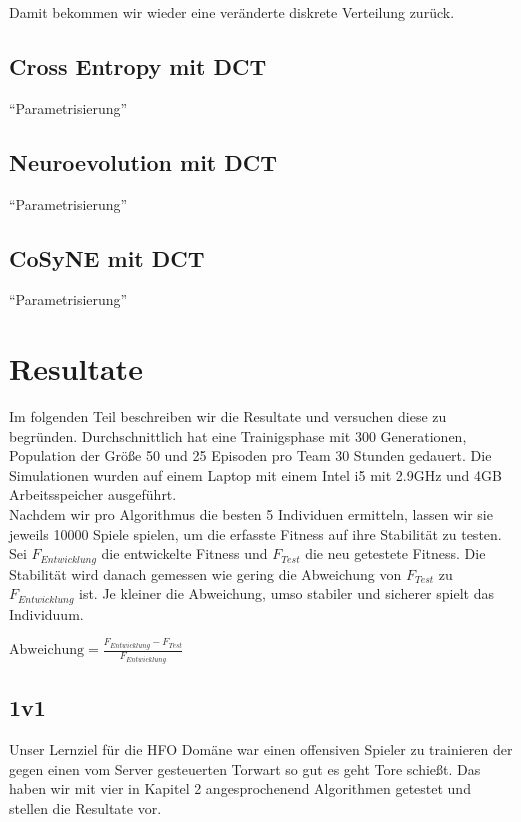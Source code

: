             Damit bekommen wir wieder eine veränderte diskrete Verteilung zurück.
        \subsection{Cross Entropy mit DCT}
            ``Parametrisierung''
        \subsection{Neuroevolution mit DCT}
            ``Parametrisierung''
        \subsection{CoSyNE mit DCT}
            ``Parametrisierung''

    \section{Resultate}
        Im folgenden Teil beschreiben wir die Resultate und versuchen diese zu begründen. Durchschnittlich hat eine Trainigsphase mit 300 Generationen, Population der Größe 50 und 25 Episoden pro Team 30 Stunden gedauert. Die Simulationen wurden auf einem Laptop mit einem Intel i5 mit 2.9GHz und 4GB Arbeitsspeicher ausgeführt.\\[2mm]
        \noindent
        Nachdem wir pro Algorithmus die besten 5 Individuen ermitteln, lassen wir sie jeweils 10000 Spiele spielen, um die erfasste Fitness auf ihre Stabilität zu testen. \\[2mm]
        \noindent
        Sei $F_{Entwicklung}$ die entwickelte Fitness und $F_{Test}$ die neu getestete Fitness. Die Stabilität wird danach gemessen wie gering die Abweichung von $F_{Test}$ zu $F_{Entwicklung}$ ist. Je kleiner die Abweichung, umso stabiler und sicherer spielt das Individuum.\\

        \begin{center}
            \begin{math}
                \text{Abweichung} = \frac{F_{Entwicklung} - F_{Test}}{F_{Entwicklung}}
            \end{math}
        \end{center}

        \subsection{1v1}
            Unser Lernziel für die HFO Domäne war einen offensiven Spieler zu trainieren der gegen einen vom Server gesteuerten Torwart so gut es geht Tore schießt. Das haben wir mit vier in Kapitel 2 angesprochenend Algorithmen getestet und stellen die Resultate vor. 

